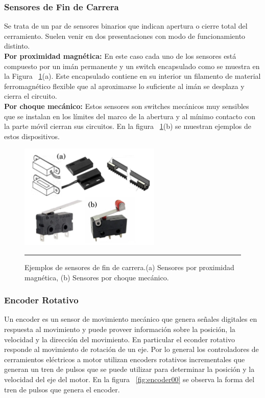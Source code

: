 \subsubsection{Sensores de Fin de Carrera}
\label{section:fincarrera}
Se trata de un par de sensores binarios que indican apertura o cierre total del cerramiento.
Suelen venir en dos presentaciones con modo de funcionamiento distinto.\\
\textbf{Por proximidad magnética:} En este caso cada uno de los sensores está compuesto por un imán permanente y un switch encapsulado como se muestra en la Figura ~\ref{fig:fincarrera}(a). Este encapsulado contiene en su interior un filamento de material ferromagnético flexible que al aproximarse lo suficiente al imán se desplaza y cierra el circuito.\\
\textbf{Por choque mecánico:} Estos sensores son switches mecánicos muy sensibles que se instalan en los límites del marco de la abertura y al mínimo contacto con la parte móvil cierran sus circuitos. En la figura ~\ref{fig:fincarrera}(b) se muestran ejemplos de estos dispositivos.

\begin{figure}[htbp]
	\centering
	\includegraphics[width=0.6\textwidth]{Pictures/fincarrera.png}
	\rule{35em}{1pt}
	\caption[Sensores de fin de carrera]{Ejemplos de sensores de fin de carrera.(a) Sensores por proximidad magnética, (b) Sensores por choque mecánico. }
	\label{fig:fincarrera}
\end{figure}

\subsubsection{Encoder Rotativo}
Un encoder es un sensor de movimiento mecánico que genera señales digitales en respuesta al movimiento y puede proveer  información sobre la posición, la velocidad y la dirección del movimiento. En particular el econder rotativo responde al movimiento de rotación de un eje. Por lo general los controladores de cerramientos eléctricos a motor utilizan encoders rotativos incrementales que generan un tren de pulsos que se puede utilizar para determinar la posición y la velocidad del eje del motor. En la figura ~\ref{fig:encoder00} se observa la forma del tren de pulsos que genera el encoder.

